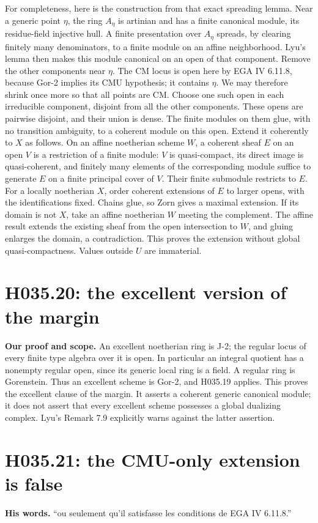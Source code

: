 For completeness, here is the construction from that exact spreading
lemma. Near a generic point $\eta$, the ring $A_\eta$ is artinian and
has a finite canonical module, its residue-field injective hull. A finite
presentation over $A_\eta$ spreads, by clearing finitely many
denominators, to a finite module on an affine neighborhood. Lyu's lemma
then makes this module canonical on an open of that component. Remove
the other components near $\eta$. The CM locus is open here by EGA IV
6.11.8, because Gor-2 implies its CMU hypothesis; it contains $\eta$.
We may therefore shrink once more so that all points are CM. Choose
one such open in each irreducible component, disjoint from all the other
components. These opens are pairwise disjoint, and their union is dense.
The finite modules on them glue, with no transition ambiguity, to a
coherent module on this open. Extend it coherently to $X$ as follows.
On an affine noetherian scheme $W$, a coherent sheaf $E$ on an open
$V$ is a restriction of a finite module: $V$ is quasi-compact, its
direct image is quasi-coherent, and finitely many elements of the
corresponding module suffice to generate $E$ on a finite principal
cover of $V$. Their finite submodule restricts to $E$.
For a locally noetherian $X$, order coherent extensions of $E$ to
larger opens, with the identifications fixed. Chains glue, so Zorn
gives a maximal extension. If its domain is not $X$, take an affine
noetherian $W$ meeting the complement. The affine result extends
the existing sheaf from the open intersection to $W$, and gluing
enlarges the domain, a contradiction. This proves the extension
without global quasi-compactness. Values outside $U$ are immaterial.

\section{H035.20: the excellent version of the margin}
\textbf{Our proof and scope.} An excellent noetherian ring is J-2;
the regular locus of every finite type algebra over it is open. In
particular an integral quotient has a nonempty regular open, since its
generic local ring is a field. A regular ring is Gorenstein. Thus an
excellent scheme is Gor-2, and H035.19 applies. This proves the
excellent clause of the margin. It asserts a coherent generic canonical
module; it does not assert that every excellent scheme possesses a
global dualizing complex. Lyu's Remark 7.9 explicitly warns against the
latter assertion.

\section{H035.21: the CMU-only extension is false}
\textbf{His words.} ``ou seulement qu'il satisfasse les conditions de
EGA IV 6.11.8.''

